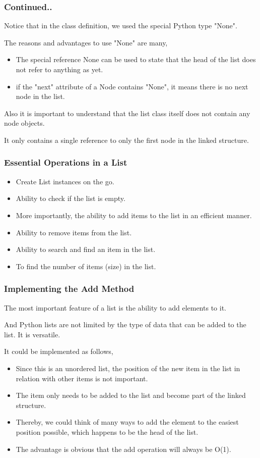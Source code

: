 \documentclass{beamer}
\begin{document}
\begin{frame}
\frametitle{Continued..}
Notice that in the class definition, we used the special Python type "None".

The reasons and advantages to use "None" are many,

\begin{itemize}
\item The special reference None can be used to state that the head of the list does not refer to anything as yet.

\item if the "next" attribute of a Node contains "None", it means there is  no next node in the list.
\end{itemize}
Also it is important to understand that the list class itself does not contain any node objects. 

It only contains a single reference to only the first node in the linked structure.

\end{frame}

\begin{frame}
\frametitle{Essential Operations in a List}

\begin{itemize}
\item Create List instances on the go.
\item Ability to check if the list is empty.
\item More importantly, the ability to add items to the list in an efficient manner.
\item Ability to remove items from the list.
\item Ability to search and find an item in the list.
\item To find the number of items (size) in the list.
\end{itemize}
\end{frame}

\begin{frame}
\frametitle{Implementing the Add Method}
The most important feature of a list is the ability to add elements to it. 

And Python lists are not limited by the type of data that can be added to the list. It is versatile.

It could be implemented as follows, 
\begin{itemize}

\item Since this is an unordered list, the position of the new item in the list in relation with other items is not important.

\item The item only needs to be added to the list and become part of the linked structure.

\item Thereby, we could think of many ways to add the element to the easiest position possible, which happens to be the head of the list.

\item The advantage is obvious that the add operation will always be O(1).

\end{itemize}
\end{frame}
\end{document}
